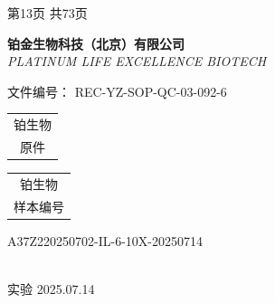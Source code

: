 \documentclass[UTF8,10pt,a4paper,fontset=fandol]{ctexart}
\newcommand{\fieldvalue}[1]{#1}
\newcommand{\handwritten}[1]{#1}
\begin{document}
第13页 共73页

\newpage

\begin{center}
\textbf{铂金生物科技（北京）有限公司}\\
\textit{PLATINUM LIFE EXCELLENCE BIOTECH}
\end{center}

\begin{flushright}
文件编号：
\fieldvalue{REC-YZ-SOP-QC-03-092-6}
\end{flushright}

\begin{center}
\begin{tabular}{|c|}
\hline
铂生物\\
\handwritten{原件}\\
\hline
\end{tabular}
\qquad
\begin{tabular}{|c|}
\hline
铂生物\\
样本编号\\
\hline
\end{tabular}
\end{center}

\begin{center}
\fieldvalue{A37Z220250702-IL-6-10X-20250714}
\end{center}

\begin{center}
\\[2pt]
\handwritten{实验 2025.07.14}
\end{center}
\end{document}
